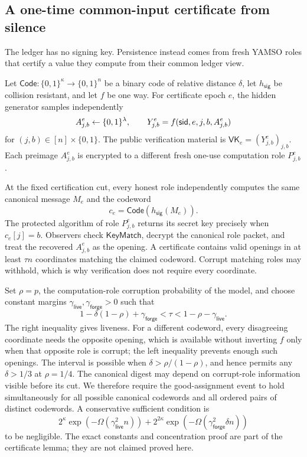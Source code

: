 \subsection{A one-time common-input certificate from silence}
\label{sec:yamso-certificate}

The ledger has no signing key.  Persistence instead comes from fresh YAMSO
roles that certify a value they compute from their common ledger view.

Let
$\mathsf{Code}:\{0,1\}^{\kappa}\rightarrow\{0,1\}^{n}$ be a binary code of
relative distance $\delta$, let $h_{\mathsf{sig}}$ be collision resistant,
and let $f$ be one way.  For certificate epoch $e$, the hidden generator
samples independently
\[
  A^e_{j,b}\mathrel{\leftarrow}\{0,1\}^{\lambda},\qquad
  Y^e_{j,b}=f(\mathsf{sid},e,j,b,A^e_{j,b})
\]
for $(j,b)\in[n]\times\{0,1\}$.  The public verification material is
$\mathsf{VK}_e=(Y^e_{j,b})_{j,b}$.  Each preimage $A^e_{j,b}$ is encrypted to
a different fresh one-use computation role $P^e_{j,b}$.

At the fixed certification cut, every honest role independently computes the
same canonical message $M_e$ and the codeword
\[
  c_e=\mathsf{Code}(h_{\mathsf{sig}}(M_e)).
\]
The protected algorithm of role $P^e_{j,b}$ returns its secret key precisely
when $c_e[j]=b$.  Observers check $\mathsf{KeyMatch}$, decrypt the canonical
role packet, and treat the recovered $A^e_{j,b}$ as the opening.  A
certificate contains valid openings in at least $\tau n$
coordinates matching the claimed codeword.  Corrupt matching roles may
withhold, which is why verification does not require every coordinate.

Set $\rho=p$, the computation-role corruption probability of the model, and
choose constant margins
$\gamma_{\mathsf{live}},\gamma_{\mathsf{forge}}>0$ such that
\[
  1-\delta(1-\rho)+\gamma_{\mathsf{forge}}
  <\tau<
  1-\rho-\gamma_{\mathsf{live}}.
  \label{eq:certificate-window}
\]
The right inequality gives liveness.  For a different codeword, every
disagreeing coordinate needs the opposite opening, which is available without
inverting $f$ only when that opposite role is corrupt; the left inequality
prevents enough such openings.  The interval is possible when
$\delta>\rho/(1-\rho)$, and hence permits any $\delta>1/3$ at
$\rho=1/4$.  The canonical digest may depend on corrupt-role information
visible before its cut.  We therefore require the good-assignment event to
hold simultaneously for all possible canonical codewords and all ordered
pairs of distinct codewords.  A conservative sufficient condition is
\[
  2^{\kappa}\exp(-\Omega(\gamma_{\mathsf{live}}^2 n))
  +2^{2\kappa}\exp(-\Omega(
       \gamma_{\mathsf{forge}}^2\delta n))
\]
to be negligible.  The exact constants and concentration proof are part of
the certificate lemma; they are not claimed proved here.

